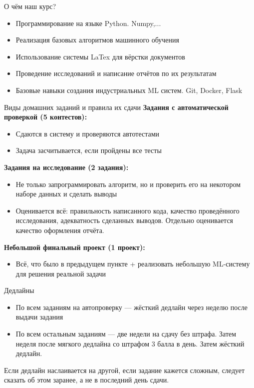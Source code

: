 \documentclass[11pt, fleqn, xcolor=x11names]{beamer}
\begin{document}
\begin{frame}{О чём наш курс?}
	\begin{itemize}
		\item Программирование на языке Python. Numpy,...
		\item Реализация базовых алгоритмов машинного обучения
		\item Использование системы LaTex для вёрстки документов
		\item Проведение исследований и написание отчётов по их результатам 
		\item Базовые навыки создания индустриальных ML систем. Git, Docker, Flask
	\end{itemize}
	
\end{frame}
\begin{frame}{Виды домашних заданий и правила их сдачи}
\textbf{Задания с автоматической проверкой (5 контестов):}
		\begin{itemize}
		\item Сдаются в систему и проверяются автотестами
		\item Задача засчитывается, если пройдены все тесты
		\end{itemize}
	
		\hfill
	
\textbf{Задания на исследование (2 задания):}
		\begin{itemize}
		\item Не только запрограммировать алгоритм, но и проверить его на некотором наборе данных и сделать выводы
		\item Оценивается всё: правильность написанного кода, качество проведённого исследования, адекватность сделанных выводов. Отдельно оценивается качество оформления отчёта.
		\end{itemize}

		\hfill
		
\textbf{Небольшой финальный проект (1 проект):}
	\begin{itemize}
	\item Всё, что было в предыдущем пункте + реализовать небольшую ML-систему для решения реальной задачи
	\end{itemize}
\end{frame}

\begin{frame}{Дедлайны}

\begin{itemize}
	\item По всем заданиям на автопроверку --- жёсткий дедлайн через неделю после выдачи задания
	
	\item По всем остальным заданиям --- две недели на сдачу без штрафа. Затем неделя после мягкого дедлайна со штрафом 3 балла в день. Затем жёсткий дедлайн.
\end{itemize}
	
	\hfill

Если дедлайн наслаивается на другой, если задание кажется сложным, следует сказать об этом заранее, а не в последний день сдачи.
	
	
	
\end{frame}
\end{document}
